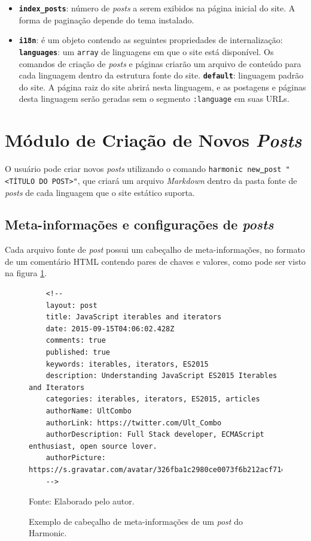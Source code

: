 \documentclass[ppginf, pep]{esinucpel}
\newcommand{\code}[1]{\texttt{#1}}
\begin{document}
\begin{itemize}
    \item \textbf{\code{index\_posts}}: número de \textit{posts} a serem exibidos na página inicial do site. A forma de paginação depende do tema instalado.
    \item \textbf{\code{i18n}}: é um objeto contendo as seguintes propriedades de internalização:
        \subitem \textbf{\code{languages}}: um \code{array} de linguagens em que o site está disponível. Os comandos de criação de \textit{posts} e páginas criarão um arquivo de conteúdo para cada linguagem dentro da estrutura fonte do site.
        \subitem \textbf{\code{default}}: linguagem padrão do site. A página raiz do site abrirá nesta linguagem, e as postagens e páginas desta linguagem serão geradas sem o segmento \code{:language} em suas URLs.
\end{itemize}

\section{Módulo de Criação de Novos \textit{Posts}}

O usuário pode criar novos \textit{posts} utilizando o comando \code{harmonic new\underline{ }post "\textless TÍTULO DO POST\textgreater"}, que criará um arquivo \emph{Markdown} dentro da pasta fonte de \textit{posts} de cada linguagem que o site estático suporta.

\subsection{Meta-informações e configurações de \textit{posts}}

Cada arquivo fonte de \textit{post} possui um cabeçalho de meta-informações, no formato de um comentário HTML contendo pares de chaves e valores, como pode ser visto na figura \ref{fig:post_header}.

\begin{figure}[H]
    \centering
    \caption{Exemplo de cabeçalho de meta-informações de um \textit{post} do Harmonic.}
    
    \lstset{language=HTML}
    \begin{lstlisting}
    <!--
    layout: post
    title: JavaScript iterables and iterators
    date: 2015-09-15T04:06:02.428Z
    comments: true
    published: true
    keywords: iterables, iterators, ES2015
    description: Understanding JavaScript ES2015 Iterables and Iterators
    categories: iterables, iterators, ES2015, articles
    authorName: UltCombo
    authorLink: https://twitter.com/Ult_Combo
    authorDescription: Full Stack developer, ECMAScript enthusiast, open source lover.
    authorPicture: https://s.gravatar.com/avatar/326fba1c2980ce0073f6b212acf71ea0
    -->
    \end{lstlisting}
    
    Fonte: Elaborado pelo autor.
    \label{fig:post_header}
\end{figure}
\end{document}
